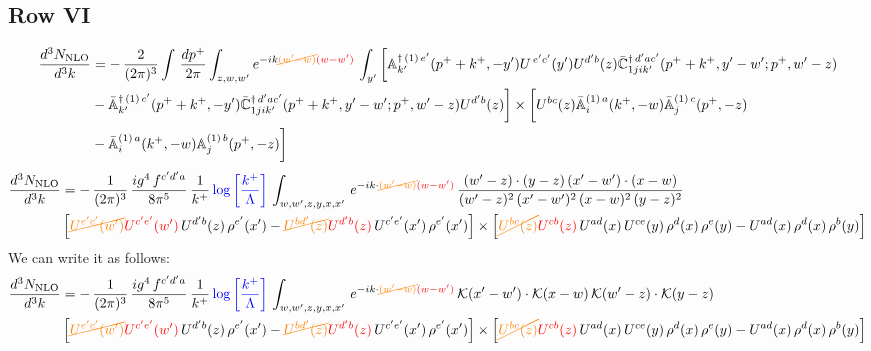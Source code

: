 \documentclass[9pt]{article}
\def\mf#1{\mathbb{#1}}
\numberwithin{equation}{section}
\begin{document}
\subsection{Row VI}
\begin{align}
     \frac{d^{3}N_{\rm NLO}}{d^{3}k} & =   -\,\frac{2}{(2\pi)^{3}} \int\, \frac{dp^{+}}{2\pi}\int_{z,w,w^{\prime}} e^{-ik{\color{orange}\cancel{(w^{\prime}-w)}}{\color{red}(w-w^{\prime})}}\, \int_{y^{\prime}}\bigg[\mf{A}^{\dagger\, (1)\,e^{\prime}}_{k^{\prime}}(p^{+}+k^{+},-y^{\prime})U^{\, e^{\prime}c^{\prime}}(y^{\prime})U^{d^{\prime}b}(z) \Bar{\mf{C}}^{\dagger\, d^{\prime}ac^{\prime}}_{1jik^{\prime}}(p^{+}+k^{+},y^{\prime}-w^{\prime}; p^{+},w^{\prime}-z) \notag \\ & -\Bar{\mf{A}}^{\dagger\, (1)\,c^{\prime}}_{k^{\prime}}(p^{+}+k^{+},-y^{\prime})\Bar{\mf{C}}^{\dagger\, d^{\prime}ac^{\prime}}_{1jik^{\prime}}(p^{+}+k^{+},y^{\prime}-w^{\prime}; p^{+},w^{\prime}-z)U^{d^{\prime}b}(z)\bigg] \times \bigg[U^{bc}(z)\Bar{\mf{A}}^{(1)\, a}_{i}(k^{+},- w)\Bar{\mf{A}}^{(1)\, c}_{j}(p^{+},-z)\notag \\ & -\Bar{\mf{A}}^{(1)\, a}_{i}(k^{+},- w) \mf{A}^{(1)\, b}_{j}(p^{+},- z)\bigg]\nonumber
\end{align}
\begin{align}
    \frac{d^{3}N_{\rm NLO}}{d^{3}k} & = -\,\frac{1}{(2\pi)^{3}}\, \frac{ig^{4}\,f^{c'd'a}}{8\pi^{5}}\, \frac{1}{k^{+}}\,{\color{blue}\log{\left[\frac{k^{+}}{\Lambda}\right]}}\, \int_{w,w',z,y,x,x'}\, e^{-ik\cdot {\color{orange}\cancel{(w'-w)}}{\color{red}(w-w')}}\,\frac{(w'-z)\cdot (y-z)\,(x'-w')\cdot (x-w)}{(w'-z)^{2}\,(x'-w')^{2}\,(x-w)^{2}\,(y-z)^{2}}\notag \\ & \left[{\color{orange}\cancel{U^{e'c'}(w')}}{\color{red}U^{c'e'}(w')}\,U^{d'b}(z)\,\rho^{e'}(x')-{\color{orange}\cancel{U^{bd'}(z)}}{\color{red}U^{d'b}(z)}\,U^{c'e'}(x')\,\rho^{e'}(x')\right]\times  \left[{\color{orange}\cancel{U^{bc}(z)}}{\color{red}U^{cb}(z)}\,U^{ad}(x)\,U^{ce}(y)\,\rho^{d}(x)\,\rho^{e}(y)-U^{ad}(x)\,\rho^{d}(x)\,\rho^{b}(y)\right]
\end{align}
We can write it as follows:
\begin{align}
    \frac{d^{3}N_{\rm NLO}}{d^{3}k} & = -\,\frac{1}{(2\pi)^{3}}\, \frac{ig^{4}\,f^{c'd'a}}{8\pi^{5}}\, \frac{1}{k^{+}}\,{\color{blue}\log{\left[\frac{k^{+}}{\Lambda}\right]}}\, \int_{w,w',z,y,x,x'}\, e^{-ik\cdot {\color{orange}\cancel{(w'-w)}}{\color{red}(w-w')}}\,\mathcal{K}(x'-w')\cdot \mathcal{K}(x-w)\,\mathcal{K}(w'-z)\cdot \mathcal{K}(y-z)\notag \\ & \left[{\color{orange}\cancel{U^{e'c'}(w')}}{\color{red}U^{c'e'}(w')}\,U^{d'b}(z)\,\rho^{e'}(x')-{\color{orange}\cancel{U^{bd'}(z)}}{\color{red}U^{d'b}(z)}\,U^{c'e'}(x')\,\rho^{e'}(x')\right]\times  \left[{\color{orange}\cancel{U^{bc}(z)}}{\color{red}U^{cb}(z)}\,U^{ad}(x)\,U^{ce}(y)\,\rho^{d}(x)\,\rho^{e}(y)-U^{ad}(x)\,\rho^{d}(x)\,\rho^{b}(y)\right]
\end{align}
\end{document}
